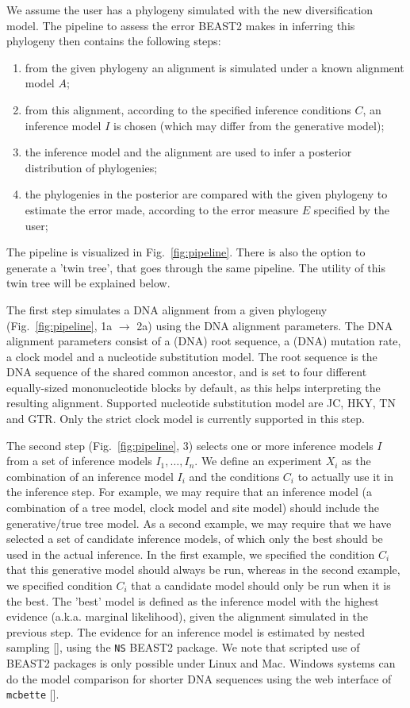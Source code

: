 We assume the user has a phylogeny simulated with the new diversification model. 
The pipeline to assess the error BEAST2 makes in inferring this phylogeny 
then contains the following steps:
\begin{enumerate}
  \item from the given phylogeny an alignment is simulated 
    under a known alignment model $\mathit{A}$;
  \item from this alignment, according to the specified 
    inference conditions $\mathit{C}$, 
    an inference model $\mathit{I}$ is chosen (which may differ from the 
    generative model);
  \item the inference model and the alignment are used 
    to infer a posterior distribution of phylogenies;
  \item the phylogenies in the posterior are compared with the given phylogeny 
    to estimate the error made, according to 
    the error measure $\mathit{E}$ specified by the user;
\end{enumerate}
The pipeline is visualized in Fig.~\ref{fig:pipeline}. 
There is also the option to generate a 'twin tree', 
that goes through the same pipeline. 
The utility of this twin tree will be explained below.

The first step simulates a DNA alignment from a given 
phylogeny (Fig.~\ref{fig:pipeline}, 1a $\rightarrow$ 2a)
using the DNA alignment parameters.
The DNA alignment parameters consist of 
a (DNA) root sequence, a (DNA) mutation rate, a clock model 
and a nucleotide substitution model.
The root sequence is the DNA sequence of the shared common ancestor,
and is set to four different equally-sized mononucleotide blocks by default, as this
helps interpreting the resulting alignment.
Supported nucleotide substitution model
are JC, HKY, TN and GTR. Only the strict
clock model is currently supported in this step.

The second step (Fig.~\ref{fig:pipeline}, 3)
selects one or more inference models $I$ from a set of inference 
models $I_{1},\dots,I_{n}$. 
We define an experiment $X_{i}$ as the combination of 
an inference model $I_{i}$ and the conditions $C_{i}$ 
to actually use it in the inference step.
For example, we may require that an inference
model (a combination of a tree model, clock model and site model) 
should include the generative/true tree model. 
As a second example, we may require that we have selected a set of 
candidate inference models,
of which only the best should be used in the actual inference.
In the first example, we specified the condition $C_{i}$ that this
generative model should always be run, whereas in the second example,
we specified condition $C_{i}$ that a candidate model should only be run
when it is the best.
The 'best' model is defined as the inference model with
the highest evidence (a.k.a. marginal likelihood), given the alignment 
simulated in the previous step.
The evidence for an inference model is estimated by nested 
sampling [\cite{maturana2018model}], using the \verb;NS; BEAST2 package. 
We note that scripted use of BEAST2 packages is only possible under Linux and Mac.
Windows systems can do the model comparison for shorter DNA sequences 
using the web interface of \verb;mcbette; [\cite{mcbette}].

